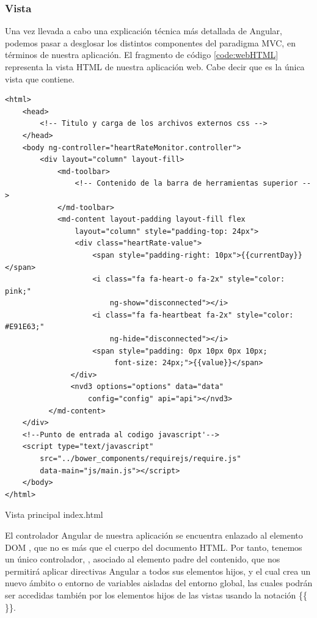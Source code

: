 \subsubsection{Vista}
Una vez llevada a cabo una explicación técnica más detallada de Angular, podemos pasar a desglosar los distintos componentes del paradigma MVC, en términos de nuestra aplicación. El fragmento de código \ref{code:webHTML} representa la vista HTML de nuestra aplicación web. Cabe decir que es la única vista que contiene.

\begin{listing}[!htbp] 
\begin{verbatim}
<html>
    <head>
        <!-- Titulo y carga de los archivos externos css -->
    </head>
    <body ng-controller="heartRateMonitor.controller">
        <div layout="column" layout-fill>
            <md-toolbar>
                <!-- Contenido de la barra de herramientas superior -->
            </md-toolbar>
            <md-content layout-padding layout-fill flex 
                layout="column" style="padding-top: 24px">
                <div class="heartRate-value">
                    <span style="padding-right: 10px">{{currentDay}}</span>
                    <i class="fa fa-heart-o fa-2x" style="color: pink;" 
                        ng-show="disconnected"></i>
                    <i class="fa fa-heartbeat fa-2x" style="color: #E91E63;"
                        ng-hide="disconnected"></i>
                    <span style="padding: 0px 10px 0px 10px;
                         font-size: 24px;">{{value}}</span>
               </div>
               <nvd3 options="options" data="data" 
                   config="config" api="api"></nvd3>
          </md-content>
    </div>
    <!--Punto de entrada al codigo javascript'-->
    <script type="text/javascript" 
        src="../bower_components/requirejs/require.js"
        data-main="js/main.js"></script>
    </body>
</html>
\end{verbatim}
\caption{Vista principal index.html}
\label{code:webHTML}
\end{listing}

El controlador Angular de nuestra aplicación se encuentra enlazado al elemento DOM , que no es más que el cuerpo del documento HTML. Por tanto, tenemos un único controlador, , asociado al elemento padre del contenido, que nos permitirá aplicar directivas Angular a todos sus elementos hijos, y el cual crea un nuevo ámbito o entorno de variables aisladas del entorno global, las cuales podrán ser accedidas también por los elementos hijos de las vistas usando la notación \{\{ \}\}.

